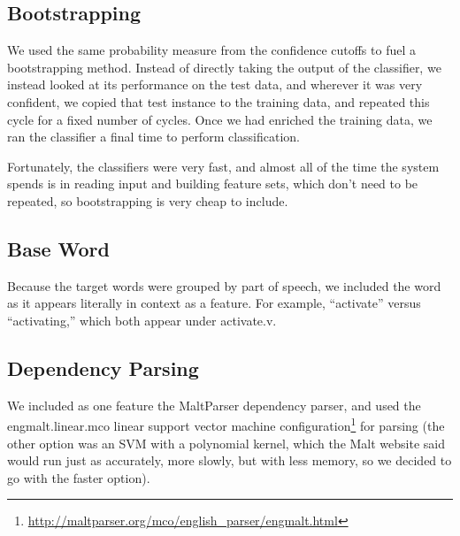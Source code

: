 \documentclass{article}
\begin{document}

\subsection{Bootstrapping}

We used the same probability measure from the confidence cutoffs to fuel a
bootstrapping method.  Instead of directly taking the output of the classifier,
we instead looked at its performance on the test data, and wherever it was very
confident, we copied that test instance to the training data, and repeated this
cycle for a fixed number of cycles.  Once we had enriched the training data, we
ran the classifier a final time to perform classification.

Fortunately, the classifiers were very fast, and almost all of the time the
system spends is in reading input and building feature sets, which don't need to
be repeated, so bootstrapping is very cheap to include.


\subsection{Base Word}

Because the target words were grouped by part of speech, we included the word as it appears literally in context as a feature.  For example, ``activate'' versus ``activating,'' which both appear under activate.v.

\subsection{Dependency Parsing}

We included as one feature the MaltParser dependency parser, and used the
engmalt.linear.mco linear support vector machine
configuration\footnote{\url{http://maltparser.org/mco/english_parser/engmalt.html}}
for parsing (the other option was an SVM with a polynomial kernel, which the
Malt website said would run just as accurately, more slowly, but with less memory,
so we decided to go with the faster option).
\end{document}
